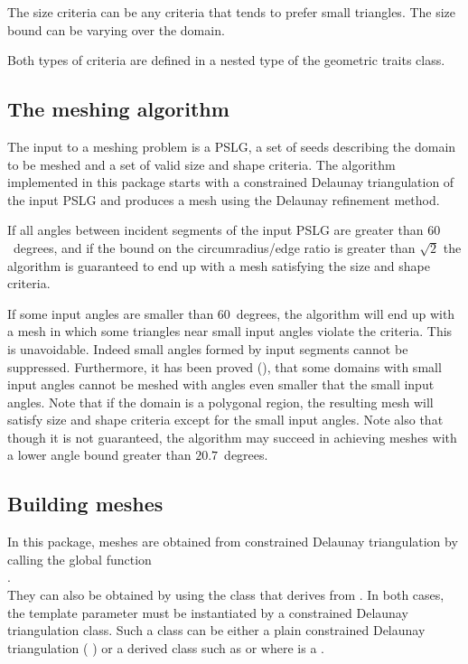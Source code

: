 The size criteria can be any criteria that tends to prefer small
triangles.  The size bound can be varying over the domain.

Both types of criteria are defined
in a nested type  of the geometric traits class.

\subsection{The meshing algorithm}

The input to a meshing problem is a PSLG, a set of seeds
describing the domain to be meshed and a set of valid size and shape
criteria.  The algorithm implemented in this package starts with a
constrained Delaunay triangulation of the input PSLG and produces a
mesh using the Delaunay refinement method.

If all angles between incident segments of the input PSLG
are greater than $60$~degrees, and if the bound on the
circumradius/edge ratio is greater than $\sqrt{2}$
the algorithm is guaranteed to end up with a mesh
satisfying the size and shape criteria.

If some input angles are smaller than $60$~degrees, the algorithm will
end up with a mesh in which some triangles near small input angles
violate the criteria.  This is unavoidable. Indeed small angles formed
by input segments cannot be suppressed. Furthermore, it has been
proved (\cite{s-mgdsa-00}), that some domains with small input angles
cannot be meshed with angles even smaller that the small input angles.
Note that if the domain is a polygonal region, the resulting mesh will
satisfy size and shape criteria except for the small input angles.
Note also that though it is not guaranteed, the algorithm may succeed
in achieving meshes with a lower angle bound greater than
$20.7$~degrees.

\subsection{Building meshes}
\label{sec:Mesh_2_building_meshes}

In this package, meshes are obtained from
constrained Delaunay triangulation by calling the global function \\
. \\
They can also be obtained by using the class
 that derives from .  In both
cases, the template parameter  must be instantiated by a
constrained Delaunay triangulation class.  Such a class can be either
a plain constrained Delaunay triangulation
( ) or a derived
class such as  or
 where  is a
.

